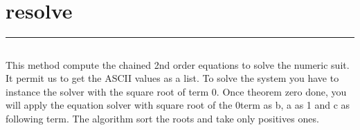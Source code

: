 \documentclass[letterpaper,10pt,english]{sphinxmanual}
\begin{document}
\subsection{}
\label{\detokenize{miamv3.1:source-code}}
\begin{sphinxVerbatim}[commandchars=\\\{\}]
\PYG{p}{[}\PYG{p}{]}
   
   
        \PYG{p}{[}\PYG{p}{]}\PYG{p}{[}\PYG{p}{]}
 
\end{sphinxVerbatim}

\newpage
\section{resolve}
\label{\detokenize{resolvev3.1:resolve}}\label{\detokenize{resolvev3.1::doc}}
\begin{sphinxVerbatim}[commandchars=\\\{\}]
 
\end{sphinxVerbatim}


\bigskip\hrule\bigskip



\subsection{}
\label{\detokenize{resolvev3.1:algorithm}}
\sphinxAtStartPar
This method compute the chained 2nd order equations to solve the numeric suit.
It permit us to get the ASCII values as a list.
To solve the system you have to instance the solver with the square root of term 0.
Once theorem zero done, you will apply the equation solver with square root of the 0\sphinxhyphen{}term as b,
a as 1 and c as \sphinxhyphen{}following term.
The algorithm sort the roots and take only positives ones.
\end{document}
